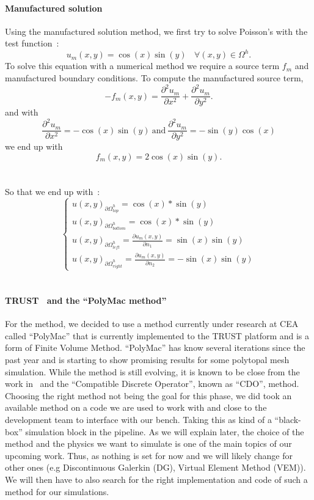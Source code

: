 \documentclass{article}
\begin{document}
\paragraph{Manufactured solution}
Using the manufactured solution method, we first try to solve Poisson's with the test function~:
\[
u_m(x,y) = \cos(x)\sin(y)~~~~\forall (x,y) \in \Omega^h.
\]
To solve this equation with a numerical method we require a source term $f_m$ and manufactured boundary conditions. To compute the manufactured source term,
\[
- f_m(x,y) = \frac{{\partial^2 u_m}}{\partial x^2} + \frac{{\partial^2 u_m}}{\partial y^2}.
\]
and with
\[
\frac{{\partial^2 u_m}}{\partial x^2} = -\cos(x)\sin(y)~\text{and}~\frac{{\partial^2 u_m}}{\partial y^2} = -\sin(y)\cos(x)
\]
we end up with \\
\[
\boxed{f_m(x,y) = 2\cos(x)\sin(y)}.
\]
\\\\
So that we end up with~:
\[
\boxed{\begin{cases}
	u(x,y)_{{\partial\Omega}_{top}^h} = \cos(x)*\sin(y) \\
	u(x,y)_{{\partial\Omega}_{bottom}^h} = \cos(x)*\sin(y) \\
	u(x,y)_{{\partial\Omega}_{left}^h} = \frac{\partial u_m(x,y)}{\partial n_1} = \sin(x)\sin(y) \\
	u(x,y)_{{\partial\Omega}_{right}^h} = \frac{\partial u_m(x,y)}{\partial n_2} = -\sin(x)\sin(y)
\end{cases}}
\]\\


\paragraph{TRUST~\cite{CEA_TRUST} and the ``PolyMac method''}

For the method, we decided to use a method currently under research at CEA called ``PolyMac'' that is currently implemented to the TRUST platform and is a form of Finite Volume Method. ``PolyMac'' has know several iterations since the past year and is starting to show promising results for some polytopal mesh simulation. While the method is still evolving, it is known to be close from the work in~\cite{bonelle2018new} and the ``Compatible Discrete Operator'', known as ``CDO'', method. Choosing the right method not being the goal for this phase, we did took an available method on a code we are used to work with and close to the development team to interface with our bench. Taking this as kind of a ``black-box'' simulation block in the pipeline. As we will explain later, the choice of the method and the physics we want to simulate is one of the main topics of our upcoming work. Thus, as nothing is set for now and we will likely change for other ones (e.g Discontinuous Galerkin (DG), Virtual Element Method (VEM)). We will then have to also search for the right implementation and code of such a method for our simulations.
\end{document}
